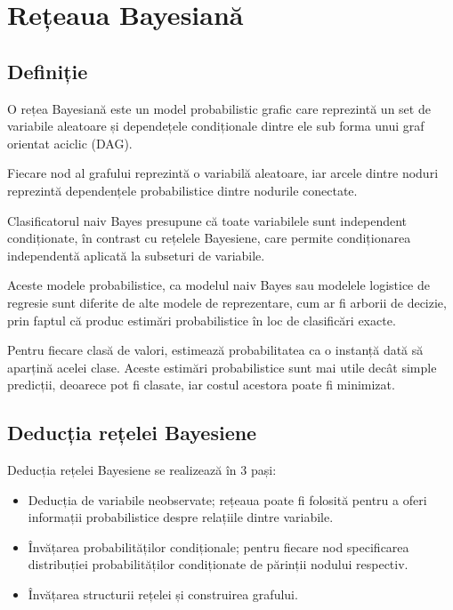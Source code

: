 
\chapter{Rețeaua Bayesiană} %

\label{Chapter2} %

\section{Definiție}

O rețea Bayesiană este un model probabilistic grafic care reprezintă un set de variabile aleatoare și dependețele condiționale dintre ele sub forma unui graf orientat aciclic (DAG).

Fiecare nod al grafului reprezintă o variabilă aleatoare, iar arcele dintre noduri reprezintă dependențele probabilistice dintre nodurile conectate.

Clasificatorul naiv Bayes presupune că toate variabilele sunt independent condiționate, în contrast cu rețelele Bayesiene, care permite condiționarea independentă aplicată la subseturi de variabile.

Aceste modele probabilistice, ca modelul naiv Bayes sau modelele logistice de regresie sunt diferite de alte modele de reprezentare, cum ar fi arborii de decizie, prin faptul că produc estimări probabilistice în loc de clasificări exacte.

Pentru fiecare clasă de valori, estimează probabilitatea ca o instanță dată să aparțină acelei clase.
Aceste estimări probabilistice sunt mai utile decât simple predicții, deoarece pot fi clasate, iar costul acestora poate fi minimizat.

\section{Deducția rețelei Bayesiene}

Deducția rețelei Bayesiene se realizează în 3 pași:
\begin{itemize}
\item Deducția de variabile neobservate; rețeaua poate fi folosită pentru a oferi informații probabilistice despre relațiile dintre variabile.
\item Învățarea probabilităților condiționale; pentru fiecare nod specificarea distribuției probabilităților condiționate de părinții nodului respectiv.
\item Învățarea structurii rețelei și construirea grafului.
\end{itemize}

